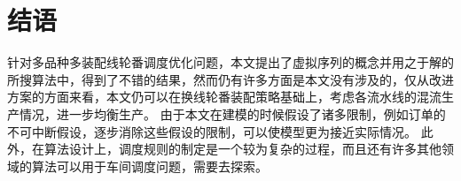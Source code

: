 \chapter{结语}
针对多品种多装配线轮番调度优化问题，本文提出了虚拟序列的概念并用之于解的所搜算法中，得到了不错的结果，然而仍有许多方面是本文没有涉及的，仅从改进方案的方面来看，本文仍可以在换线轮番装配策略基础上，考虑各流水线的混流生产情况，进一步均衡生产。
由于本文在建模的时候假设了诸多限制，例如订单的不可中断假设，逐步消除这些假设的限制，可以使模型更为接近实际情况。
此外，在算法设计上，调度规则的制定是一个较为复杂的过程，而且还有许多其他领域的算法可以用于车间调度问题，需要去探索。